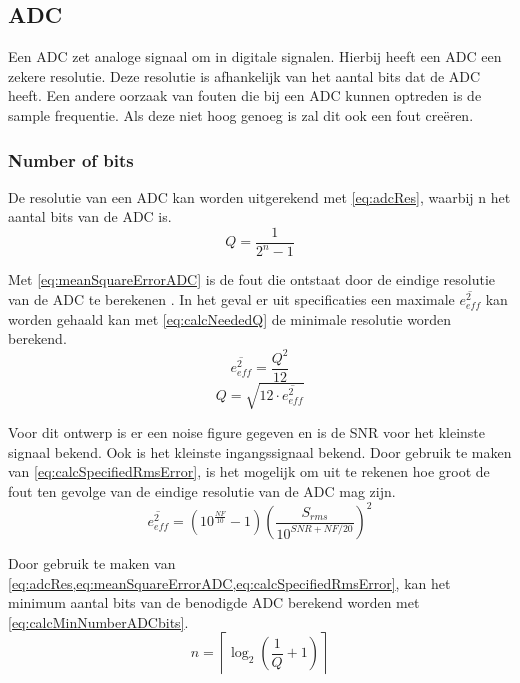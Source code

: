 \subsection{ADC}

Een ADC zet analoge signaal om in digitale signalen. Hierbij heeft een ADC een zekere resolutie. Deze resolutie is afhankelijk van het aantal bits dat de ADC heeft. Een andere oorzaak van fouten die bij een ADC kunnen optreden is de sample frequentie. Als deze niet hoog genoeg is zal dit ook een fout creëren.

\subsubsection{Number of bits} \label{sec:ADC:numBits}
De resolutie van een ADC kan worden uitgerekend met \cref{eq:adcRes}, waarbij n het aantal bits van de ADC is.
\begin{equation}\label{eq:adcRes}
    Q=\frac{1}{2^n-1}
\end{equation}

Met \cref{eq:meanSquareErrorADC} is de fout die ontstaat door de eindige resolutie van de ADC te berekenen \cite{MJHcalcADC}. In het geval er uit specificaties een maximale $\overline{e_{eff}^2}$ kan worden gehaald kan met \cref{eq:calcNeededQ} de minimale resolutie worden berekend.
\begin{equation}\label{eq:meanSquareErrorADC} 
    \overline{e_{eff}^2}=\frac{Q^2}{12}
\end{equation}
\begin{equation}\label{eq:calcNeededQ}
    Q=\sqrt{12\cdot\overline{e_{eff}^2}}
\end{equation}

Voor dit ontwerp is er een noise figure gegeven en is de SNR voor het kleinste signaal bekend. Ook is het kleinste ingangssignaal bekend. Door gebruik te maken van \cref{eq:calcSpecifiedRmsError}, is het mogelijk om uit te rekenen hoe groot de fout ten gevolge van de eindige resolutie van de ADC mag zijn.
\begin{equation}\label{eq:calcSpecifiedRmsError}
    \overline{e_{eff}^2}=\left(10^{\frac{NF}{10}}-1\right)\left(\frac{S_{rms}}{10^{SNR+NF/20}}\right)^2
\end{equation}

Door gebruik te maken van \cref{eq:adcRes,eq:meanSquareErrorADC,eq:calcSpecifiedRmsError}, kan het minimum aantal bits van de benodigde ADC berekend worden met \cref{eq:calcMinNumberADCbits}.
\begin{equation}\label{eq:calcMinNumberADCbits}
    n=\left\lceil\log_2\left(\frac{1}{Q}+1\right)\right\rceil
\end{equation}


